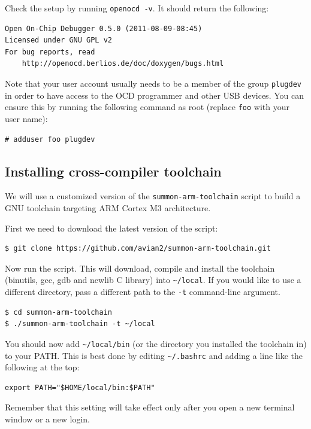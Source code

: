 \documentclass[a4paper, 10pt]{article}
\begin{document}
Check the setup by running \verb|openocd -v|. It should return the following:

\begin{verbatim}
Open On-Chip Debugger 0.5.0 (2011-08-09-08:45)
Licensed under GNU GPL v2
For bug reports, read
	http://openocd.berlios.de/doc/doxygen/bugs.html
\end{verbatim}

Note that your user account usually needs to be a member of the group
\verb|plugdev| in order to have access to the OCD programmer and other USB
devices. You can ensure this by running the following command as root (replace
\verb|foo| with your user name):

\begin{verbatim}
# adduser foo plugdev
\end{verbatim}

\subsection{Installing cross-compiler toolchain}

We will use a customized version of the \verb|summon-arm-toolchain| script to
build a GNU toolchain targeting ARM Cortex M3 architecture.

First we need to download the latest version of the script:

\begin{verbatim}
$ git clone https://github.com/avian2/summon-arm-toolchain.git
\end{verbatim}

Now run the script. This will download, compile and install the toolchain
(binutils, gcc, gdb and newlib C library) into \verb|~/local|. If you
would like to use a different directory, pass a different path to the
\verb|-t| command-line argument.

\begin{verbatim}
$ cd summon-arm-toolchain
$ ./summon-arm-toolchain -t ~/local
\end{verbatim}

You should now add \verb|~/local/bin| (or the directory you installed the toolchain
in) to your PATH. This is best done by editing \verb|~/.bashrc| and adding a
line like the following at the top:

\begin{verbatim}
export PATH="$HOME/local/bin:$PATH"
\end{verbatim}

Remember that this setting will take effect only after you open a new terminal window or
a new login.
\end{document}
